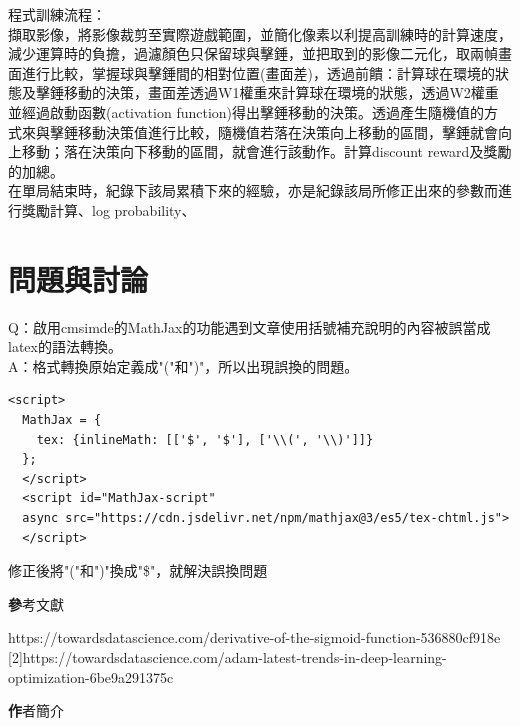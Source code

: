 \documentclass[14pt,a4paper]{report}  %
\begin{document}
程式訓練流程：\\
\qquad 擷取影像，將影像裁剪至實際遊戲範圍，並簡化像素以利提高訓練時的計算速度，減少運算時的負擔，過濾顏色只保留球與擊錘，並把取到的影像二元化，取兩幀畫面進行比較，掌握球與擊錘間的相對位置(畫面差)，透過前饋：計算球在環境的狀態及擊錘移動的決策，畫面差透過W1權重來計算球在環境的狀態，透過W2權重並經過啟動函數(activation function)得出擊錘移動的決策。透過產生隨機值的方式來與擊錘移動決策值進行比較，隨機值若落在決策向上移動的區間，擊錘就會向上移動；落在決策向下移動的區間，就會進行該動作。計算discount reward及獎勵的加總。\\

\qquad 在單局結束時，紀錄下該局累積下來的經驗，亦是紀錄該局所修正出來的參數而進行獎勵計算、log probability、\\

\newpage
\chapter{問題與討論}
Q：啟用cmsimde的MathJax的功能遇到文章使用括號補充說明的內容被誤當成latex的語法轉換。\\

A：格式轉換原始定義成"("和")"，所以出現誤換的問題。\\
\begin{lstlisting}
<script>
  MathJax = {
    tex: {inlineMath: [['$', '$'], ['\\(', '\\)']]}
  };
  </script>
  <script id="MathJax-script" 
  async src="https://cdn.jsdelivr.net/npm/mathjax@3/es5/tex-chtml.js"> 
  </script>
\end{lstlisting}
修正後將"("和")"換成"\$"，就解決誤換問題
\newpage
\begin{center}
\LARGE\textbf 參考文獻\\
\end{center}
\begin{flushleft}
\begin{Large}
[1]\quad https://towardsdatascience.com/derivative-of-the-sigmoid-function-536880cf918e\\

[2]\quad https://towardsdatascience.com/adam-latest-trends-in-deep-learning-optimization-6be9a291375c\\
\end{Large}
\end{flushleft}
\newpage
\begin{center}
\LARGE\textbf 作者簡介\\
\end{center}

\end{document}
